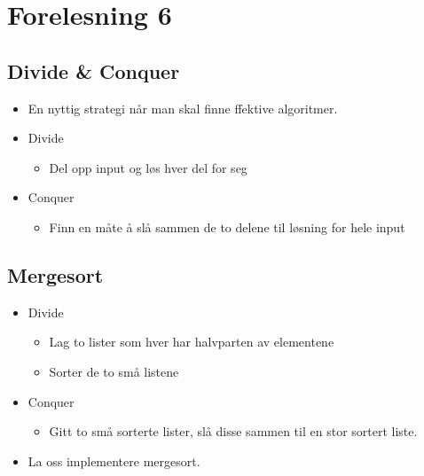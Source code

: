 \documentclass{article}
\begin{document}
    \section{Forelesning 6}

    \subsection{Divide \& Conquer}
    \begin{itemize}
        \item En nyttig strategi når man skal finne ffektive algoritmer.
        \item Divide
            \begin{itemize}
                \item Del opp input og løs hver del for seg
            \end{itemize}
        \item Conquer
            \begin{itemize}
                \item Finn en måte å slå sammen de to delene til løsning for hele input
            \end{itemize}
    \end{itemize}

    \subsection{Mergesort}
    \begin{itemize}
        \item Divide
            \begin{itemize}
                \item Lag to lister som hver har halvparten av elementene
                \item Sorter de to små listene
            \end{itemize}
        \item Conquer
            \begin{itemize}
                \item Gitt to små sorterte lister, slå disse sammen til en stor sortert liste.
            \end{itemize}
            \item La oss implementere mergesort.
    \end{itemize}
\end{document}
